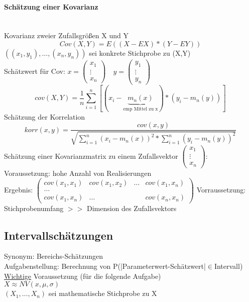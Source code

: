 \documentclass[a4paper,12pt]{scrartcl}
\begin{document}
  \paragraph{Schätzung einer Kovarianz}\quad\\
  Kovarianz zweier Zufallsgrößen X und Y
  $$Cov(X,Y) = E((X-EX)*(Y-EY))$$
  $((x_1,y_1),\dots,(x_n,y_n))$ sei konkrete Stichprobe zu (X,Y)\\
  Schätzwert für Cov:  $x=\begin{pmatrix}x_1\\\vdots\\x_n\end{pmatrix}\quad y=\begin{pmatrix}y_1\\\vdots\\y_n\end{pmatrix}$\\
  $$cov(X,Y) = \frac{1}{n}\sum_{i=1}^n[(x_i-\underbrace{m_n(x)}_{\text{emp Mittel zu x}})*(y_i-m_n(y))]$$
  Schätzung der Korrelation
  $$korr(x,y) = \frac{cov(x,y)}{\sqrt{\sum_{i=1}^n(x_i-m_n(x))^2*\sum_{i=1}^n(y_i-m_n(y))^2}} $$
  Schätzung einer Kovarianzmatrix zu einem Zufallsvektor $\begin{pmatrix}x_1\\\vdots\\x_n\end{pmatrix}$:\\
  Voraussetzung: hohe Anzahl von Realisierungen\\
  Ergebnis: $\begin{pmatrix}
		cov(x_1,x_1)& cov(x_1,x_2) & \dots & cov(x_1,x_n)\\
		\dots \\
		cov(x_1,x_n) & \dots & & cov(x_n,x_n)
	      \end{pmatrix}$
  Vorraussetzung: Stichprobenumfang $>>$ Dimension des Zufallsvektors
 
  \subsection{Intervallschätzungen}
    
  Synonym: Bereichs-Schätzungen\\
  Aufgabenstellung: Berechnung von P(|Parameterwert-Schätzwert|$\in$Intervall)\\
  \underline{Wichtige} Voraussetzung (für die folgende Aufgabe)\\
  $X\approx NV(x,\mu,\sigma)$\\
  $(X_1,\dots,X_n)$ sei mathematische Stichprobe zu X\\
\end{document}
